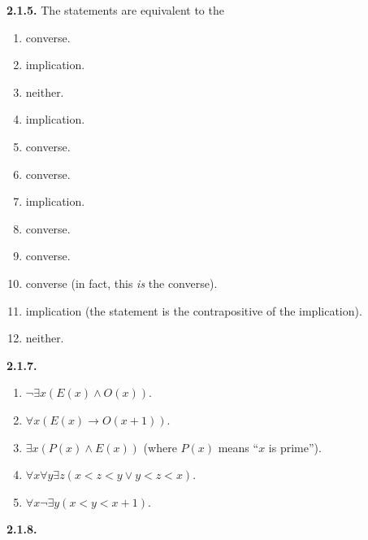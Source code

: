 \documentclass[10pt,]{book}
\theoremstyle{plain}
\theoremstyle{definition}
\theoremstyle{definition}
\theoremstyle{definition}
\theoremstyle{definition}
\numberwithin{equation}{chapter}
\newcommand{\imp}{\rightarrow}
\newcommand{\lt}{<}
\begin{document}
%
\par\smallskip
\noindent\textbf{2.1.5.} \hypertarget{p-1131}{}%
The statements are equivalent to the\textellipsis{} \leavevmode%
\begin{enumerate}[label=(\alph*)]
\item\hypertarget{li-565}{}\hypertarget{p-1132}{}%
converse.%
\item\hypertarget{li-566}{}\hypertarget{p-1133}{}%
implication.%
\item\hypertarget{li-567}{}\hypertarget{p-1134}{}%
neither.%
\item\hypertarget{li-568}{}\hypertarget{p-1135}{}%
implication.%
\item\hypertarget{li-569}{}\hypertarget{p-1136}{}%
converse.%
\item\hypertarget{li-570}{}\hypertarget{p-1137}{}%
converse.%
\item\hypertarget{li-571}{}\hypertarget{p-1138}{}%
implication.%
\item\hypertarget{li-572}{}\hypertarget{p-1139}{}%
converse.%
\item\hypertarget{li-573}{}\hypertarget{p-1140}{}%
converse.%
\item\hypertarget{li-574}{}\hypertarget{p-1141}{}%
converse (in fact, this \emph{is} the converse).%
\item\hypertarget{li-575}{}\hypertarget{p-1142}{}%
implication (the statement is the contrapositive of the implication).%
\item\hypertarget{li-576}{}\hypertarget{p-1143}{}%
neither.%
\end{enumerate}
%
\par\smallskip
\noindent\textbf{2.1.7.} \hypertarget{p-1152}{}%
\leavevmode%
\begin{enumerate}[label=(\alph*)]
\item\hypertarget{li-582}{}\(\neg \exists x (E(x) \wedge O(x))\).%
\item\hypertarget{li-583}{}\(\forall x (E(x) \imp O(x+1))\).%
\item\hypertarget{li-584}{}\(\exists x(P(x) \wedge E(x))\) (where \(P(x)\) means ``\(x\) is prime'').%
\item\hypertarget{li-585}{}\(\forall x \forall y \exists z(x \lt  z \lt  y \vee y \lt  z \lt  x)\).%
\item\hypertarget{li-586}{}\(\forall x \neg \exists y (x \lt  y \lt  x+1)\).%
\end{enumerate}
%
\par\smallskip
\noindent\textbf{2.1.8.} \hypertarget{p-1154}{}%
\leavevmode%
\end{document}
